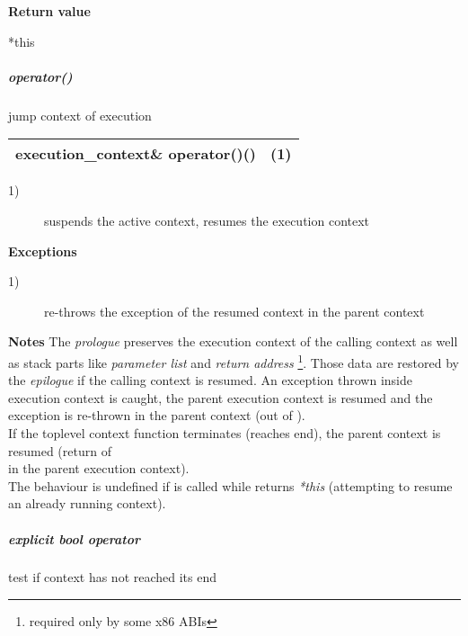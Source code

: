 {\bfseries Return value}
\begin{description}
    \item[*this]
\end{description}

\subparagraph*{operator()}
jump context of execution\\

\begin{tabular}{ l l }
    \midrule

    {\ttfamily\small\color{black}execution\_context\& {\color{blue}operator}()()} & (1)\\

    \midrule
\end{tabular}

\begin{description}
    \item[1)] suspends the active context, resumes the execution context\\
\end{description}

{\bfseries Exceptions}
\begin{description}
    \item[1)] re-throws the exception of the resumed context in the parent context\\
\end{description}

{\bfseries Notes}
\newline
The \emph{prologue} preserves the execution context of the calling context as well
as stack parts like \emph{parameter list} and \emph{return address}
\footnote{required only by some x86 ABIs}. Those data are restored by the
\emph{epilogue} if the calling context is resumed.
\newline
An exception thrown inside execution context is caught, the parent execution
context is resumed and the exception is re-thrown in the parent context (out of
\ectxop).\\
If the toplevel context function terminates (reaches end), the parent context is
resumed (return of\\
\ectxop in the parent execution context).\\
The behaviour is undefined if  is called while 
returns \emph{*this} (attempting to resume an already running context).

\subparagraph*{explicit bool operator}
test if context has not reached its end\\

